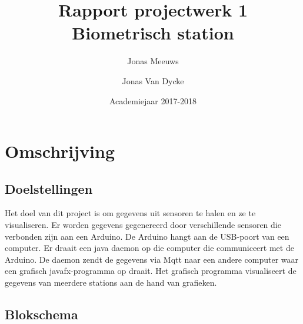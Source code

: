 \documentclass[a4paper]{report}
\title{Rapport projectwerk 1\\ Biometrisch station}
\author{Jonas Meeuws \and Jonas Van Dycke}
\date{Academiejaar 2017-2018}
\begin{document}
\maketitle
\tableofcontents

\chapter{Omschrijving}
    \section{Doelstellingen}
        Het doel van dit project is om gegevens uit sensoren te halen en ze te visualiseren.
        Er worden gegevens gegenereerd door verschillende sensoren die verbonden zijn aan een Arduino.
        De Arduino hangt aan de USB-poort van een computer.
        Er draait een java daemon op die computer die communiceert met de Arduino.
        De daemon zendt de gegevens via Mqtt naar een andere computer waar een grafisch javafx-programma op draait.
        Het grafisch programma visualiseert de gegevens van meerdere stations aan de hand van grafieken.

    \section{Blokschema}
        
\end{document}

